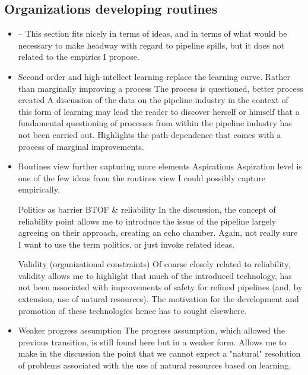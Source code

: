 	\subsection{Organizations developing routines}
	\begin{paracol}{2}
	\begin{itemize}
		\item --
		\switchcolumn This section fits nicely in terms of ideas, and in terms of what would be necessary to make headway with regard to pipeline spills, but it does not related to the empirics I propose.
		\switchcolumn*
				
		\item Second order \citep{Argyris1978} and high-intellect learning \citep{March2010} replace the learning curve.
			\subitem Rather than marginally improving a process
			\subitem The process is questioned, better process created
		\switchcolumn A discussion of the data on the pipeline industry in the context of this form of learning may lead the reader to discover herself or himself that a fundamental questioning of processes from within the pipeline industry has not been carried out. Highlights the path-dependence that comes with a process of marginal improvements.
		\switchcolumn*
		
		\item Routines view further capturing more elements
			\subitem Aspirations
		\switchcolumn Aspiration level is one of the few ideas from the routines view I could possibly capture empirically.
		\switchcolumn*
				
			\subitem Politics as barrier
				\subsubitem BTOF \& reliability
		\switchcolumn In the discussion, the concept of reliability point allows me to introduce the issue of the pipeline largely agreeing on their approach, creating an echo chamber. Again, not really sure I want to use the term politics, or just invoke related ideas.
		\switchcolumn*
			
			\subitem Validity (organizational constraints)
		\switchcolumn Of course closely related to reliability, validity allows me to highlight that much of the introduced technology, has not been associated with improvements of safety for refined pipelines (and, by extension, use of natural resources). The motivation for the development and promotion of these technologies hence has to sought elsewhere.
		\switchcolumn*
			
		\item Weaker progress assumption
		\switchcolumn The progress assumption, which allowed the previous transition, is still found here but in a weaker form. Allows me to make in the discussion the point that we cannot expect a "natural" resolution of problems associated with the use of natural resources based on learning.
	\end{itemize}
	\end{paracol}

